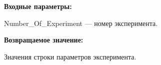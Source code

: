 \textbf{Входные параметры:}

Number\_Of\_Experiment --- номер эксперимента.

\textbf{Возвращаемое значение:}

Значения строки параметров эксперимента.